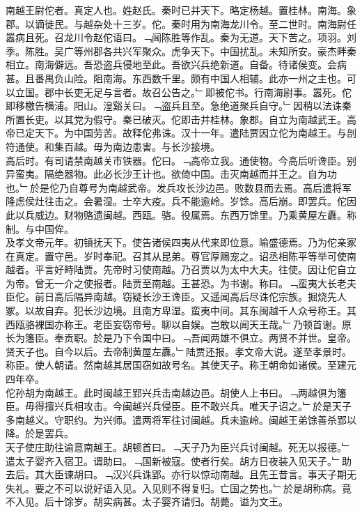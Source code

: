 \documentclass{zhvt-classic}
\begin{document}

\hspace*{2em}南越王尉佗者。真定人也。姓赵氏。秦时已并天下。略定杨越。置桂林。南海。象郡。以谪徙民。与越杂处十三岁。佗。秦时用为南海龙川令。至二世时。南海尉任嚣病且死。召龙川令赵佗语曰。﹁闻陈胜等作乱。秦为无道。天下苦之。项羽。刘季。陈胜。吴广等州郡各共兴军聚众。虎争天下。中国扰乱。未知所安。豪杰畔秦相立。南海僻远。吾恐盗兵侵地至此。吾欲兴兵绝新道。自备。待诸侯变。会病甚。且番禺负山险。阻南海。东西数千里。颇有中国人相辅。此亦一州之主也。可以立国。郡中长吏无足与言者。故召公告之。﹂即被佗书。行南海尉事。嚣死。佗即移檄告横浦。阳山。湟谿关曰。﹁盗兵且至。急绝道聚兵自守。﹂因稍以法诛秦所置长吏。以其党为假守。秦已破灭。佗即击并桂林。象郡。自立为南越武王。高帝已定天下。为中国劳苦。故释佗弗诛。汉十一年。遣陆贾因立佗为南越王。与剖符通使。和集百越。毋为南边患害。与长沙接境。\\
\hspace*{2em}高后时。有司请禁南越关市铁器。佗曰。﹁高帝立我。通使物。今高后听谗臣。别异蛮夷。隔绝器物。此必长沙王计也。欲倚中国。击灭南越而并王之。自为功也。﹂於是佗乃自尊号为南越武帝。发兵攻长沙边邑。败数县而去焉。高后遣将军隆虑侯灶往击之。会暑湿。士卒大疫。兵不能逾岭。岁馀。高后崩。即罢兵。佗因此以兵威边。财物赂遗闽越。西瓯。骆。役属焉。东西万馀里。乃乘黄屋左纛。称制。与中国侔。\\
\hspace*{2em}及孝文帝元年。初镇抚天下。使告诸侯四夷从代来即位意。喻盛德焉。乃为佗亲冢在真定。置守邑。岁时奉祀。召其从昆弟。尊官厚赐宠之。诏丞相陈平等举可使南越者。平言好畤陆贾。先帝时习使南越。乃召贾以为太中大夫。往使。因让佗自立为帝。曾无一介之使报者。陆贾至南越。王甚恐。为书谢。称曰。﹁蛮夷大长老夫臣佗。前日高后隔异南越。窃疑长沙王谗臣。又遥闻高后尽诛佗宗族。掘烧先人冢。以故自弃。犯长沙边境。且南方卑湿。蛮夷中间。其东闽越千人众号称王。其西瓯骆裸国亦称王。老臣妄窃帝号。聊以自娱。岂敢以闻天王哉。﹂乃顿首谢。原长为籓臣。奉贡职。於是乃下令国中曰。﹁吾闻两雄不俱立。两贤不并世。皇帝。贤天子也。自今以后。去帝制黄屋左纛。﹂陆贾还报。孝文帝大说。遂至孝景时。称臣。使人朝请。然南越其居国窃如故号名。其使天子。称王朝命如诸侯。至建元四年卒。\\
\hspace*{2em}佗孙胡为南越王。此时闽越王郢兴兵击南越边邑。胡使人上书曰。﹁两越俱为籓臣。毋得擅兴兵相攻击。今闽越兴兵侵臣。臣不敢兴兵。唯天子诏之。﹂於是天子多南越义。守职约。为兴师。遣两将军往讨闽越。兵未逾岭。闽越王弟馀善杀郢以降。於是罢兵。\\
\hspace*{2em}天子使庄助往谕意南越王。胡顿首曰。﹁天子乃为臣兴兵讨闽越。死无以报德。﹂遣太子婴齐入宿卫。谓助曰。﹁国新被寇。使者行矣。胡方日夜装入见天子。﹂助去后。其大臣谏胡曰。﹁汉兴兵诛郢。亦行以惊动南越。且先王昔言。事天子期无失礼。要之不可以说好语入见。入见则不得复归。亡国之势也。﹂於是胡称病。竟不入见。后十馀岁。胡实病甚。太子婴齐请归。胡薨。谥为文王。\\
\end{document}
